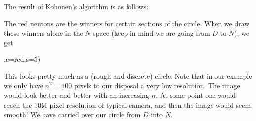 \documentclass[a4paper,12pt,polish]{jupyterBook}
\begin{document}
\sphinxAtStartPar
The result of Kohonen’s algorithm is as follows:
\begin{sphinxVerbatimOutput}

\noindent{}
\end{sphinxVerbatimOutput}

\sphinxAtStartPar
The red neurons are the winners for certain sections of the circle. When we draw these winners alone in the \(N\) space (keep in mind we are going from \(D\) to \(N\)), we get
\begin{sphinxVerbatimInput}

\begin{sphinxVerbatim}[commandchars=\\\{\}]


,c=\PYGZsq{}red\PYGZsq{},s=5)

\end{sphinxVerbatim}
\end{sphinxVerbatimInput}
\begin{sphinxVerbatimOutput}

\noindent{}
\end{sphinxVerbatimOutput}

\sphinxAtStartPar
This looks pretty much as a (rough and discrete) circle. Note that in our example we only have \(n^2=100\) pixels to our disposal \sphinxhyphen{} a very low resolution. The image would look better and better with an increasing \(n\). At some point one would reach the 10M pixel resolution of typical camera, and then the image would seem smooth! We have carried over our circle from \(D\) into \(N\).
\end{document}
